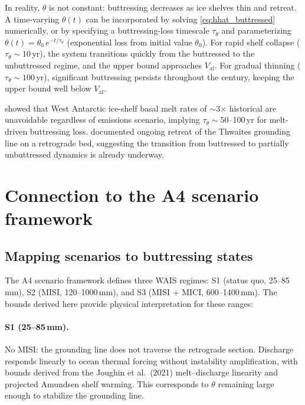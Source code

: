 \documentclass[11pt]{article}
\newcommand{\Vaf}{V_{\mathrm{af}}}
\begin{document}
In reality, $\theta$ is not constant: buttressing decreases as ice shelves thin and retreat. A time-varying $\theta(t)$ can be incorporated by solving \eqref{eq:hhat_buttressed} numerically, or by specifying a buttressing-loss timescale $\tau_\theta$ and parameterizing $\theta(t) = \theta_0\,e^{-t/\tau_\theta}$ (exponential loss from initial value $\theta_0$). For rapid shelf collapse ($\tau_\theta \sim 10$\,yr), the system transitions quickly from the buttressed to the unbuttressed regime, and the upper bound approaches $\Vaf$. For gradual thinning ($\tau_\theta \sim 100$\,yr), significant buttressing persists throughout the century, keeping the upper bound well below $\Vaf$.

\citet{Naughten2023} showed that West Antarctic ice-shelf basal melt rates of $\sim$3$\times$ historical are unavoidable regardless of emissions scenario, implying $\tau_\theta \sim 50$--100\,yr for melt-driven buttressing loss. \citet{Joughin2014} documented ongoing retreat of the Thwaites grounding line on a retrograde bed, suggesting the transition from buttressed to partially unbuttressed dynamics is already underway.


\section{Connection to the A4 scenario framework}
\label{sec:a4_connection}

\subsection{Mapping scenarios to buttressing states}

The A4 scenario framework defines three WAIS regimes: S1 (status quo, 25--85\,mm), S2 (MISI, 120--1000\,mm), and S3 (MISI + MICI, 600--1400\,mm). The bounds derived here provide physical interpretation for these ranges:

\paragraph{S1 (25--85\,mm).} No MISI: the grounding line does not traverse the retrograde section. Discharge responds linearly to ocean thermal forcing without instability amplification, with bounds derived from the Joughin et al.\ (2021) melt--discharge linearity and projected Amundsen shelf warming. This corresponds to $\theta$ remaining large enough to stabilize the grounding line.
\end{document}
